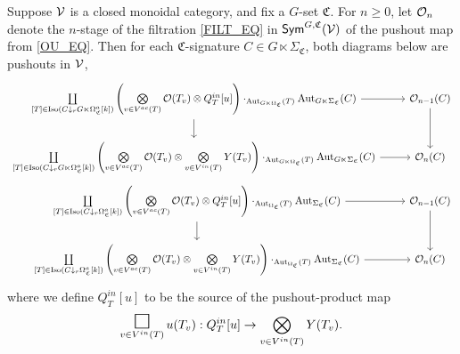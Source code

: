 \documentclass[a4paper,10pt
,draft
]{article}%
\renewcommand{\1}{\eta}%
\newcommand{\SC}{\Sigma_{\mathfrak C}}
\newcommand{\OC}{\Omega_{\mathfrak C}}
\begin{document}
\begin{proposition}
      \label{FILT_PUSH_PROP}
      Suppose $\mathcal V$ is a closed monoidal category, and fix a $G$-set $\mathfrak C$.
      For $n \geq 0$, let $\mathcal{O}_n$ denote the $n$-stage of the filtration \eqref{FILT_EQ} in $\mathsf{Sym}^{G, \mathfrak C}(\mathcal V)$
      of the pushout map from \eqref{OU_EQ}.
      Then for each $\mathfrak C$-signature $C \in G \ltimes \Sigma_{\mathfrak C}$,
      both diagrams below are pushouts in $\mathcal V$,
      \vspace{-10pt}
      \begin{align}
        \label{FILT_PUSHG_EQ}
        \begin{tikzcd}[ampersand replacement=\&]
              \mathop{\coprod}\limits_{[T] \in \Iso(C \downarrow_r G \ltimes \Omega_{\mathfrak C}^a[k])}
              \left(
                    \mathop{\bigotimes}\limits_{v \in V^{ac}(T)} \O(T_v) \otimes
                    Q^{in}_T[u]
              \right) \cdot_{\Aut_{G \ltimes \OC}(T)} \Aut_{G \ltimes \SC}(C)
              \arrow[r]
              \arrow[d]
              \&
              \O_{n-1}(C) \arrow[d]
              \\                  
              \mathop{\coprod}\limits_{[T] \in \Iso(C \downarrow_r G \ltimes \Omega_{\mathfrak C}^a[k])}
              \left(
                    \mathop{\bigotimes}\limits_{v \in V^{ac}(T)} \O(T_v) \otimes
                    \mathop{\bigotimes}\limits_{v \in V^{in}(T)} Y(T_v)
              \right) \cdot_{\Aut_{G \ltimes \OC}(T)} \Aut_{G \ltimes \SC}(C)
              \arrow[r]
              \&
              \O_n(C)
        \end{tikzcd}
        \\
        \label{FILT_PUSH_EQ}
        \begin{tikzcd}[ampersand replacement=\&]
              \mathop{\coprod}\limits_{[T] \in \Iso(C \downarrow_r \Omega_{\mathfrak C}^a[k])}
              \left(
                    \mathop{\bigotimes}\limits_{v \in V^{ac}(T)} \O(T_v) \otimes
                    Q^{in}_T[u]
              \right) \cdot_{\Aut_{\OC} (T)} \Aut_{\SC}(C)
              \arrow[r]
              \arrow[d]
              \&[15pt]
              \O_{n-1}(C) \arrow[d]
              \\                  
              \mathop{\coprod}\limits_{[T] \in \Iso(C \downarrow_r \Omega_{\mathfrak C}^a[k])}
              \left(
                    \mathop{\bigotimes}\limits_{v \in V^{ac}(T)} \O(T_v) \otimes
                    \mathop{\bigotimes}\limits_{v \in V^{in}(T)} Y(T_v)
              \right) \cdot_{\Aut_{\OC}(T)} \Aut_{\SC}(C)
              \arrow[r]
              \&
              \O_n(C)
        \end{tikzcd}
      \end{align}
      where we define $Q^{in}_T[u]$ to be the source of the pushout-product map
      \begin{equation}
            \mathop{\mathlarger{\mathlarger{\mathlarger{\square}}}}_{v \in V^{in}(T)} u(T_v): Q^{in}_T[u] \to \bigotimes_{v \in V^{in}(T)} Y(T_v).
      \end{equation}
\end{proposition}
\end{document}
